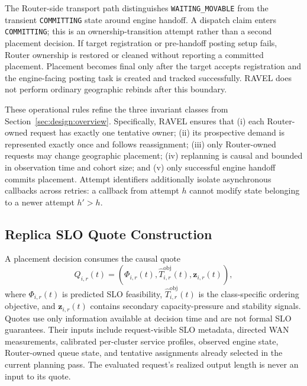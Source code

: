 \documentclass[letterpaper,twocolumn,10pt]{article}
\begin{document}
The Router-side transport path distinguishes
\texttt{WAITING\_MOVABLE} from the transient \texttt{COMMITTING} state around
engine handoff.
A dispatch claim enters \texttt{COMMITTING}; this is an ownership-transition
attempt rather than a second placement decision.
If target registration or pre-handoff posting setup fails, Router ownership is
restored or cleaned without reporting a committed placement.
Placement becomes final only after the target accepts registration and the
engine-facing posting task is created and tracked successfully.
RAVEL does not perform ordinary geographic rebinds after this boundary.

These operational rules refine the three invariant classes from
Section~\ref{sec:design:overview}.
Specifically, RAVEL ensures that
(i) each Router-owned request has exactly one tentative owner;
(ii) its prospective demand is represented exactly once and follows
reassignment;
(iii) only Router-owned requests may change geographic placement;
(iv) replanning is causal and bounded in observation time and cohort size;
and (v) only successful engine handoff commits placement.
Attempt identifiers additionally isolate asynchronous callbacks across
retries: a callback from attempt $h$ cannot modify state belonging to a newer
attempt $h'>h$.


\subsection{Replica SLO Quote Construction}
\label{sec:appendix:quotes}

A placement decision consumes the causal quote
\begin{equation}
    Q_{i,r}(t)
    =
    \left(
        \Phi_{i,r}(t),
        \widehat{T}^{\mathrm{obj}}_{i,r}(t),
        \mathbf{z}_{i,r}(t)
    \right),
    \label{eq:appendix:quote-tuple}
\end{equation}
where $\Phi_{i,r}(t)$ is predicted SLO feasibility,
$\widehat{T}^{\mathrm{obj}}_{i,r}(t)$ is the class-specific ordering objective,
and $\mathbf{z}_{i,r}(t)$ contains secondary capacity-pressure and stability
signals.
Quotes use only information available at decision time and are not formal SLO
guarantees.
Their inputs include request-visible SLO metadata, directed WAN measurements,
calibrated per-cluster service profiles, observed engine state, Router-owned
queue state, and tentative assignments already selected in the current
planning pass.
The evaluated request's realized output length is never an input to its quote.
\end{document}
